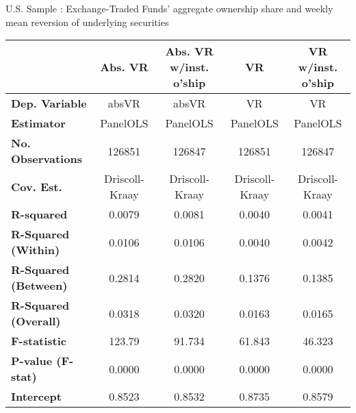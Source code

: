 \begin{center}
  \caption{U.S. Sample : Exchange-Traded Funds' aggregate ownership share and weekly mean reversion of underlying securities}
  \label{tab:Efficiency:US:Comp}
  \begin{tabular}{lcccc}
\toprule
                                           &  \textbf{Abs. VR}  & \textbf{Abs. VR w/inst. o'ship} &    \textbf{VR}     & \textbf{VR w/inst. o'ship}  \\
\midrule
\textbf{Dep. Variable}                     &       absVR        &              absVR              &         VR         &             VR              \\
\textbf{Estimator}                         &      PanelOLS      &             PanelOLS            &      PanelOLS      &          PanelOLS           \\
\textbf{No. Observations}                  &       126851       &              126847             &       126851       &           126847            \\
\textbf{Cov. Est.}                         &   Driscoll-Kraay   &          Driscoll-Kraay         &   Driscoll-Kraay   &       Driscoll-Kraay        \\
\textbf{R-squared}                         &       0.0079       &              0.0081             &       0.0040       &           0.0041            \\
\textbf{R-Squared (Within)}                &       0.0106       &              0.0106             &       0.0040       &           0.0042            \\
\textbf{R-Squared (Between)}               &       0.2814       &              0.2820             &       0.1376       &           0.1385            \\
\textbf{R-Squared (Overall)}               &       0.0318       &              0.0320             &       0.0163       &           0.0165            \\
\textbf{F-statistic}                       &       123.79       &              91.734             &       61.843       &           46.323            \\
\textbf{P-value (F-stat)}                  &       0.0000       &              0.0000             &       0.0000       &           0.0000            \\
\midrule
\textbf{Intercept}                         &       0.8523       &              0.8532             &       0.8735       &           0.8579            \\

\end{tabular}
\end{center}
